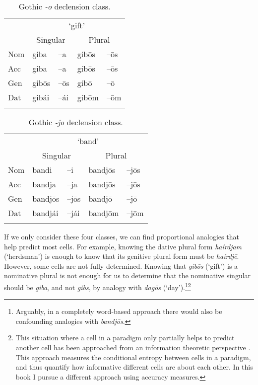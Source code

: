 \begin{table}[!htbp]
    \centering
    \caption{Gothic \textit{-o} declension class.}\label{tab:o-class-gothic}
    \begin{tabular}{lllll}
      \lsptoprule
      & \multicolumn{4}{c}{`gift'}                   \\
      & \multicolumn{2}{c}{Singular} & \multicolumn{2}{c}{Plural} \\
      \midrule
      Nom & giba                         & –a  & gibōs & –ōs          \\
      Acc & giba                         & –a  & gibōs & –ōs          \\
      Gen & gibōs                        & –ōs & gibō  & –ō           \\
      Dat & gibái                        & –ái & gibōm & –ōm          \\
      \lspbottomrule
    \end{tabular}
\end{table}

\begin{table}[!htbp]
  \centering
  \caption{Gothic \textit{-jo} declension class.}\label{tab:jo-class-gothic}
  \begin{tabular}{lllll}
    \lsptoprule
        & \multicolumn{4}{c}{`band'}                                \\
        & \multicolumn{2}{c}{Singular} & \multicolumn{2}{c}{Plural} \\
    \midrule
    Nom & bandi                        & –i   & bandjōs & –jōs      \\
    Acc & bandja                       & –ja  & bandjōs & –jōs      \\
    Gen & bandjōs                      & –jōs & bandjō  & –jō       \\
    Dat & bandjái                      & –jái & bandjōm & –jōm      \\
    \lspbottomrule
  \end{tabular}
\end{table}

If we only consider these four classes, we can find proportional analogies that help predict most cells. For example, knowing the dative plural form \textit{haírdjam} (`herdsman') is enough to know that its genitive plural form must be \textit{haírdjē}. However, some cells are not fully determined. Knowing that \textit{gibōs} (`gift') is a nominative plural is not enough for us to determine that the nominative singular should be \textit{giba}, and not \textit{gibs}, by analogy with \textit{dagōs} (`day').\footnote{Arguably, in a completely word-based approach there would also be confounding analogies with \textit{bandjōs}.}\footnote{This situation where a cell in a paradigm only partially helps to predict another cell has been approached from an information theoretic perspective \autocite{MoscosodelPradoMartin.2004a, Ackerman.2013a, Blevins.2013, Ackerman.2016, Bonami.2016}. This approach measures the conditional entropy between cells in a paradigm, and thus quantify how informative different cells are about each other. In this book I pursue a different approach using accuracy measures.}

